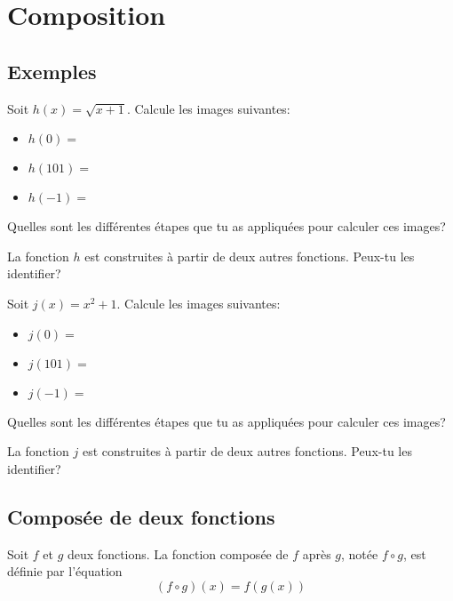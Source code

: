 \documentclass[a4paper,12pt]{report}
\begin{document}
\section{Composition}
\label{sec:org34146eb}
\subsection{Exemples}
\label{sec:org8099cda}
\begin{exemple}
Soit \(h(x)=\sqrt{x+1}\). Calcule les images suivantes:

\begin{itemize}
\item \(h(0)=\) \dotfill
\item \(h(101)=\) \dotfill
\item \(h(-1)=\) \dotfill
\end{itemize}

Quelles sont les différentes étapes que tu as appliquées pour calculer ces
images?

\vspace{2cm}

La fonction \(h\) est construites à partir de deux autres fonctions. Peux-tu les
identifier?

\vspace{2cm}
\end{exemple}
\newpage
\begin{exemple}
Soit \(j(x)=x^2+1\). Calcule les images suivantes:

\begin{itemize}
\item \(j(0)=\) \dotfill
\item \(j(101)=\) \dotfill
\item \(j(-1)=\) \dotfill
\end{itemize}

Quelles sont les différentes étapes que tu as appliquées pour calculer ces
images?

\vspace{2cm}

La fonction \(j\) est construites à partir de deux autres fonctions. Peux-tu les
identifier?
\vspace{2cm}
\end{exemple}
\subsection{Composée de deux fonctions}
\label{sec:org2120824}

\begin{definition}
Soit \(f\) et \(g\) deux fonctions. La fonction composée de \(f\) après \(g\), notée
\(f\circ g\), est définie par l'équation
\[
(f\circ g)(x)=f(g(x))
\]
\end{definition}
\end{document}
